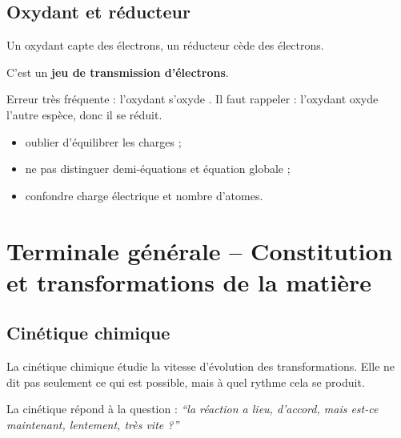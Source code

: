 \documentclass[11pt,a4paper]{article}
\begin{document}
\subsection{Oxydant et réducteur}

\begin{sens}
Un oxydant capte des électrons, un réducteur cède des électrons.
\end{sens}

\begin{imagem}
C'est un \textbf{jeu de transmission d'électrons}.
\end{imagem}

\begin{fausseintuition}
Erreur très fréquente :
\og l'oxydant s'oxyde \fg.
Il faut rappeler :
l'oxydant oxyde l'autre espèce, donc il se réduit.
\end{fausseintuition}

\begin{erreurs}
\begin{itemize}
    \item oublier d'équilibrer les charges ;
    \item ne pas distinguer demi-équations et équation globale ;
    \item confondre charge électrique et nombre d'atomes.
\end{itemize}
\end{erreurs}

\newpage

\section{Terminale générale -- Constitution et transformations de la matière}

\subsection{Cinétique chimique}

\begin{sens}
La cinétique chimique étudie la vitesse d'évolution des transformations.
Elle ne dit pas seulement ce qui est possible, mais à quel rythme cela se produit.
\end{sens}

\begin{imagem}
La cinétique répond à la question :
\textit{``la réaction a lieu, d'accord, mais est-ce maintenant, lentement, très vite ?''}
\end{imagem}
\end{document}
